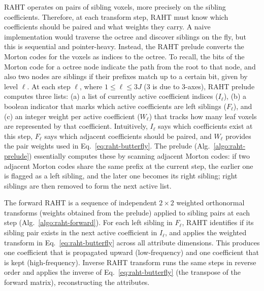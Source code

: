 RAHT operates on pairs of sibling voxels, more precisely on the sibling coefficients.
%
Therefore, at each transform step, RAHT must know which coefficients should be paired and what weights they carry.
%
A naive implementation would traverse the octree and discover siblings on the fly, but this is sequential and pointer-heavy.
%
Instead, the RAHT prelude converts the Morton codes for the voxels as indices to the octree.
%
To recall, the bits of the Morton code for a octree node indicate the path from the root to that node, and also two nodes are siblings if their prefixes match up to a certain bit, given by level $\ell$.
%
At each step $\ell$, where $1 \le \ell \le 3J$ (3 is due to 3-axes), RAHT prelude computes three lists:
%
(a) a list of currently active coefficient indices ($I_\ell$),
%
(b) a boolean indicator that marks which active coefficients are left siblings ($F_\ell$), and
%
(c) an integer weight per active coefficient ($W_\ell$) that tracks how many leaf voxels are represented by that coefficient.
%
Intuitively, $I_\ell$ says which coefficients exist at this step, $F_\ell$ says which adjacent coefficients should be paired, and $W_\ell$ provides the pair weights used in Eq.~\ref{eq:raht-butterfly}.
%
The prelude (Alg.~\ref{algo:raht-prelude}) essentially computes these by scanning adjacent Morton codes: if two adjacent Morton codes share the same prefix at the current step, the earlier one is flagged as a left sibling, and the later one becomes its right sibling; right siblings are then removed to form the next active list.

The forward RAHT is a sequence of independent $2\times2$ weighted orthonormal transforms (weights obtained from the prelude) applied to sibling pairs at each step (Alg.~\ref{algo:raht-forward}).
%
For each left sibling in $F_\ell$, RAHT identifies if its sibling pair exists in the next active coefficient in $I_\ell$, and applies the weighted transform in Eq.~\ref{eq:raht-butterfly} across all attribute dimensions.
%
This produces one coefficient that is propagated upward (low-frequency) and one coefficient that is kept (high-frequency).
%
Inverse RAHT transform runs the same steps in reverse order and applies the inverse of Eq.~\ref{eq:raht-butterfly} (the transpose of the forward matrix), reconstructing the attributes.

